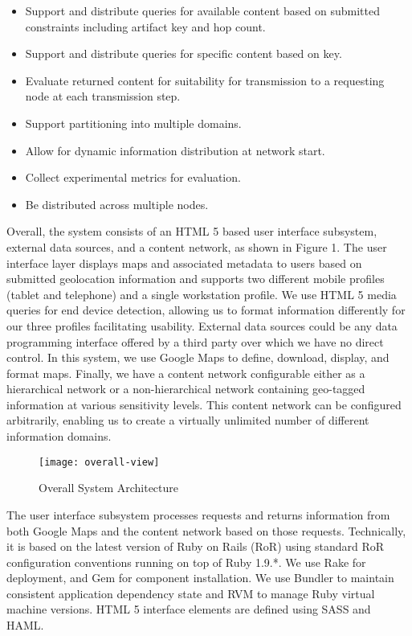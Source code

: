 \begin{itemize}
\item Support and distribute queries for available content based on submitted constraints including artifact key and hop count.
\item Support and distribute queries for specific content based on key.
\item Evaluate returned content for suitability for transmission to a requesting node at each transmission step.
\item Support partitioning into multiple domains.
\item Allow for dynamic information distribution at network start.
\item Collect experimental metrics for evaluation.
\item Be distributed across multiple nodes.
\end{itemize}

Overall, the system consists of an HTML 5 based user interface subsystem, external data sources, and a content network, as shown in Figure 1.  The user interface layer displays maps and associated metadata to users based on submitted geolocation information and supports two different mobile profiles (tablet and telephone) and a single workstation profile.  We use HTML 5 media queries for end device detection, allowing us to format information differently for our three profiles facilitating usability.  External data sources could be any data programming interface offered by a third party over which we have no direct control.  In this system, we use Google Maps to define, download, display, and format maps.  Finally, we have a content network configurable either as a hierarchical network or a non-hierarchical network containing geo-tagged information at various sensitivity levels.  This content network can be configured arbitrarily, enabling us to create a virtually unlimited number of different information domains.

\begin{figure}[!t]
\centering
\texttt{[image: overall-view]}
\caption{Overall System Architecture}
\label{fig:model:overall-view}
\end{figure}

The user interface subsystem processes requests and returns information from both Google Maps and the content network based on those requests.  Technically, it is based on the latest version of Ruby on Rails (RoR) using standard RoR configuration conventions running on top of Ruby 1.9.*.  We use Rake for deployment, and Gem for component installation.  We use Bundler to maintain consistent application dependency state and RVM to manage Ruby virtual machine versions.  HTML 5 interface elements are defined using SASS and HAML.


